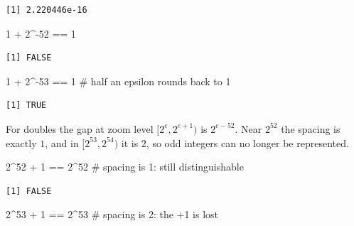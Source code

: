 \documentclass[
  letterpaper,
  DIV=11,
  numbers=noendperiod]{scrreprt}
\newenvironment{Shaded}{\begin{snugshade}}{\end{snugshade}}
\newcommand{\CommentTok}[1]{\textcolor[rgb]{0.37,0.37,0.37}{#1}}
\newcommand{\DecValTok}[1]{\textcolor[rgb]{0.68,0.00,0.00}{#1}}
\newcommand{\SpecialCharTok}[1]{\textcolor[rgb]{0.37,0.37,0.37}{#1}}
\begin{document}
\begin{verbatim}
[1] 2.220446e-16
\end{verbatim}

\begin{Shaded}
\begin{Highlighting}[]
\DecValTok{1} \SpecialCharTok{+} \DecValTok{2}\SpecialCharTok{\^{}{-}}\DecValTok{52} \SpecialCharTok{==} \DecValTok{1}
\end{Highlighting}
\end{Shaded}

\begin{verbatim}
[1] FALSE
\end{verbatim}

\begin{Shaded}
\begin{Highlighting}[]
\DecValTok{1} \SpecialCharTok{+} \DecValTok{2}\SpecialCharTok{\^{}{-}}\DecValTok{53} \SpecialCharTok{==} \DecValTok{1}           \CommentTok{\# half an epsilon rounds back to 1}
\end{Highlighting}
\end{Shaded}

\begin{verbatim}
[1] TRUE
\end{verbatim}

For doubles the gap at zoom level \([2^e, 2^{e+1})\) is \(2^{e-52}\).
Near \(2^{52}\) the spacing is exactly \(1\), and in
\([2^{53}, 2^{54})\) it is \(2\), so odd integers can no longer be
represented.

\begin{Shaded}
\begin{Highlighting}[]
\DecValTok{2}\SpecialCharTok{\^{}}\DecValTok{52} \SpecialCharTok{+} \DecValTok{1} \SpecialCharTok{==} \DecValTok{2}\SpecialCharTok{\^{}}\DecValTok{52}             \CommentTok{\# spacing is 1: still distinguishable}
\end{Highlighting}
\end{Shaded}

\begin{verbatim}
[1] FALSE
\end{verbatim}

\begin{Shaded}
\begin{Highlighting}[]
\DecValTok{2}\SpecialCharTok{\^{}}\DecValTok{53} \SpecialCharTok{+} \DecValTok{1} \SpecialCharTok{==} \DecValTok{2}\SpecialCharTok{\^{}}\DecValTok{53}             \CommentTok{\# spacing is 2: the +1 is lost}
\end{Highlighting}
\end{Shaded}
\end{document}
